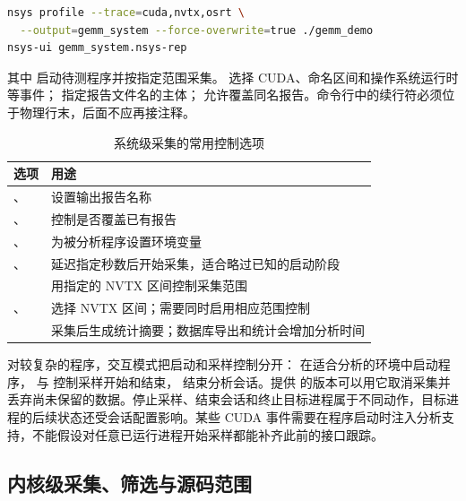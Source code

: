 \noindent\begin{minipage}{\linewidth}
\begin{lstlisting}[style=cuda,language=bash,numbers=none,caption={系统级采集与报告查看}]
nsys profile --trace=cuda,nvtx,osrt \
  --output=gemm_system --force-overwrite=true ./gemm_demo
nsys-ui gemm_system.nsys-rep
\end{lstlisting}
\end{minipage}

其中  启动待测程序并按指定范围采集。 选择 CUDA、命名区间和操作系统运行时等事件； 指定报告文件名的主体； 允许覆盖同名报告。命令行中的续行符必须位于物理行末，后面不应再接注释。

\begin{table}[htbp]
\centering\small
\caption{系统级采集的常用控制选项}
\label{l14:tab:nsys-options}
\begin{tabularx}{\textwidth}{@{}p{52mm}Y@{}}
\toprule
选项 & 用途\\
\midrule
{}、 & 设置输出报告名称\\
、 & 控制是否覆盖已有报告\\
、 & 为被分析程序设置环境变量\\
、 & 延迟指定秒数后开始采集，适合略过已知的启动阶段\\
 & 用指定的 NVTX 区间控制采集范围\\
、 & 选择 NVTX 区间；需要同时启用相应范围控制\\
 & 采集后生成统计摘要；数据库导出和统计会增加分析时间\\
\bottomrule
\end{tabularx}
\end{table}

对较复杂的程序，交互模式把启动和采样控制分开： 在适合分析的环境中启动程序， 与  控制采样开始和结束， 结束分析会话。提供  的版本可以用它取消采集并丢弃尚未保留的数据。停止采样、结束会话和终止目标进程属于不同动作，目标进程的后续状态还受会话配置影响。某些 CUDA 事件需要在程序启动时注入分析支持，不能假设对任意已运行进程开始采样都能补齐此前的接口跟踪。

\subsection{内核级采集、筛选与源码范围}

